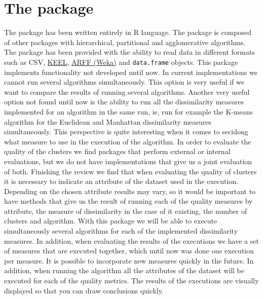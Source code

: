 \section {The  package} \label{sec:seccion3}
The  package has been written entirely in R language. The package is composed of other packages with hierarchical, partitional and agglomerative algorithms. The package has been provided with the ability to read data in different formats such as CSV, \href{https://sci2s.ugr.es/keel/references.php}{KEEL}, \href{https://www.cs.waikato.ac.nz/ml/weka/}{ARFF (Weka)} and \texttt{data.frame} objects. This package implements functionality not developed until now. In current implementations we cannot run several algorithms simultaneously. This option is very useful if we want to compare the results of running several algorithms. Another very useful option not found until now is the ability to run all the dissimilarity measures implemented for an algorithm in the same run, ie, run for example the K-means algorithm for the Euclidean and Manhattan dissimilarity measures simultaneously. This perspective is quite interesting when it comes to secidong what measure to use in the execution of the algorithm. In order to evaluate the quality of the clusters we find packages that perform external or internal evaluations, but we do not have implementations that give us a joint evaluation of both. Finishing the review we find that when evaluating the quality of clusters it is necessary to indicate an attribute of the dataset used in the execution. Depending on the chosen attribute results may vary, so it would be important to have methods that give us the result of running each of the quality measures by attribute, the measure of dissimilarity in the case of it existing, the number of clusters and algorithm. With this  package we will be able to execute simultaneously several algorithms for each of the implemented dissimilarity measures. In addition, when evaluating the results of the executions we have a set of measures that are executed together, which until now was done one execution per measure. It is possible to incorporate new measures quickly in the future. In addition, when running the algorithm all the attributes of the dataset will be executed for each of the quality metrics. The results of the executions are visually displayed so that you can draw conclusions quickly.

